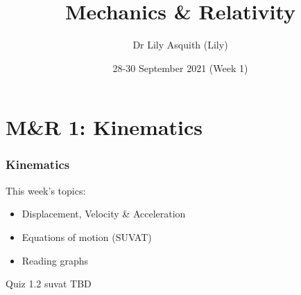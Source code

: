 


% 
\title[ Mechanics \& Relativity]{Mechanics \& Relativity}
\author[Dr Lily Asquith (Lily)]{ Dr Lily Asquith (Lily)}
\date[28-30 September 2021]{28-30 September 2021 (Week 1)}





\begin{frame}
\titlepage
\end{frame} 

\section{M\&R 1: Kinematics}
\begin{frame}
\frametitle{Kinematics} 
\normalsize

This week's topics:\\[3ex]

\begin{itemize}
\item[1.1] Displacement, Velocity \& Acceleration\\[3ex]
\item[1.2] Equations of motion (SUVAT)\\[3ex]
\item[1.3] Reading graphs\\[3ex]
\end{itemize}
\end{frame} 
 
\begin{frame}{Quiz 1.2 suvat}
TBD
\vspace{6cm}
\end{frame}




